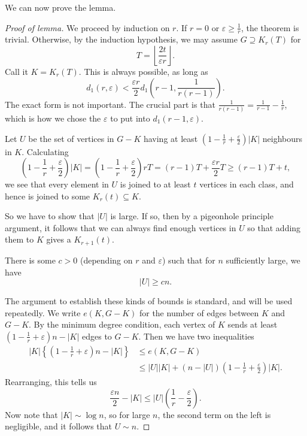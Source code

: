 \documentclass[a4paper]{article}
\begin{document}
We can now prove the lemma.

\begin{proof}[Proof of lemma]
  We proceed by induction on $r$. If $r = 0$ or $\varepsilon \geq \frac{1}{r}$, the theorem is trivial. Otherwise, by the induction hypothesis, we may assume $G \supseteq K_r(T)$ for
  \[
    T = \left\lfloor \frac{2t}{\varepsilon r}\right\rfloor.
  \]
  Call it $K = K_r(T)$. This is always possible, as long as
  \[
    d_1(r, \varepsilon) < \frac{\varepsilon r}{2} d_1\left(r - 1, \frac{1}{r(r - 1)}\right).
  \]
  The exact form is not important. The crucial part is that $\frac{1}{r(r - 1)} = \frac{1}{r - 1} - \frac{1}{r}$, which is how we chose the $\varepsilon$ to put into $d_1(r - 1, \varepsilon)$.

  Let $U$ be the set of vertices in $G - K$ having at least $\left(1 - \frac{1}{r} + \frac{\varepsilon}{2}\right)|K|$ neighbours in $K$. Calculating
  \[
    \left(1 - \frac{1}{r} + \frac{\varepsilon}{2}\right) |K| = \left(1 - \frac{1}{r} + \frac{\varepsilon}{2}\right) rT = (r - 1)T + \frac{\varepsilon r}{2}T \geq (r - 1)T + t,
  \]
  we see that every element in $U$ is joined to at least $t$ vertices in each class, and hence is joined to some $K_r(t) \subseteq K$.

  So we have to show that $|U|$ is large. If so, then by a pigeonhole principle argument, it follows that we can always find enough vertices in $U$ so that adding them to $K$ gives a $K_{r + 1}(t)$.
  \begin{claim}
    There is some $c > 0$ (depending on $r$ and $\varepsilon$) such that for $n$ sufficiently large, we have
    \[
      |U| \geq cn.
    \]
  \end{claim}

  The argument to establish these kinds of bounds is standard, and will be used repeatedly. We write $e(K, G - K)$ for the number of edges between $K$ and $G - K$. By the minimum degree condition, each vertex of $K$ sends at least $\left(1 - \frac{1}{r} + \varepsilon\right)n - |K|$ edges to $G - K$. Then we have two inequalities
  \begin{align*}
    |K| \left\{\left(1 - \frac{1}{r} + \varepsilon\right)n - |K|\right\} &\leq e(K, G - K) \\
    &\leq |U||K| + (n - |U|) \left(1 - \frac{1}{r} + \frac{\varepsilon}{2}\right)|K|.
  \end{align*}
  Rearranging, this tells us
  \[
    \frac{\varepsilon n}{2} - |K| \leq |U| \left(\frac{1}{r} - \frac{\varepsilon}{2}\right).
  \]
  Now note that $|K| \sim \log n$, so for large $n$, the second term on the left is negligible, and it follows that $U \sim n$.


\end{proof}
\end{document}
